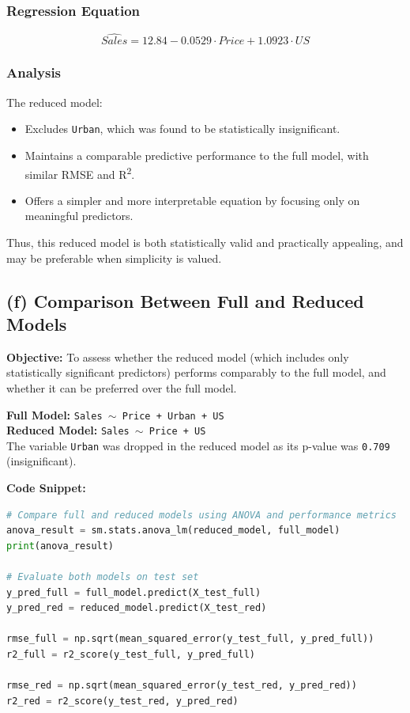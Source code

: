 \documentclass[12pt]{article}
\begin{document}
\subsubsection*{Regression Equation}

\[
\hat{Sales} = 12.84 - 0.0529 \cdot Price + 1.0923 \cdot US
\]

\subsubsection*{Analysis}

The reduced model:
\begin{itemize}
    \item Excludes \texttt{Urban}, which was found to be statistically insignificant.
    \item Maintains a comparable predictive performance to the full model, with similar RMSE and R\textsuperscript{2}.
    \item Offers a simpler and more interpretable equation by focusing only on meaningful predictors.
\end{itemize}

Thus, this reduced model is both statistically valid and practically appealing, and may be preferable when simplicity is valued.

\subsection*{(f) Comparison Between Full and Reduced Models}

\textbf{Objective:} To assess whether the reduced model (which includes only statistically significant predictors) performs comparably to the full model, and whether it can be preferred over the full model.

\vspace{0.5em}
\textbf{Full Model:} \texttt{Sales $\sim$ Price + Urban + US} \\
\textbf{Reduced Model:} \texttt{Sales $\sim$ Price + US} \\
The variable \texttt{Urban} was dropped in the reduced model as its p-value was \texttt{0.709} (insignificant).

\vspace{1em}
\textbf{Code Snippet:}
\begin{lstlisting}[language=Python]
# Compare full and reduced models using ANOVA and performance metrics
anova_result = sm.stats.anova_lm(reduced_model, full_model)
print(anova_result)

# Evaluate both models on test set
y_pred_full = full_model.predict(X_test_full)
y_pred_red = reduced_model.predict(X_test_red)

rmse_full = np.sqrt(mean_squared_error(y_test_full, y_pred_full))
r2_full = r2_score(y_test_full, y_pred_full)

rmse_red = np.sqrt(mean_squared_error(y_test_red, y_pred_red))
r2_red = r2_score(y_test_red, y_pred_red)
\end{lstlisting}
\end{document}
